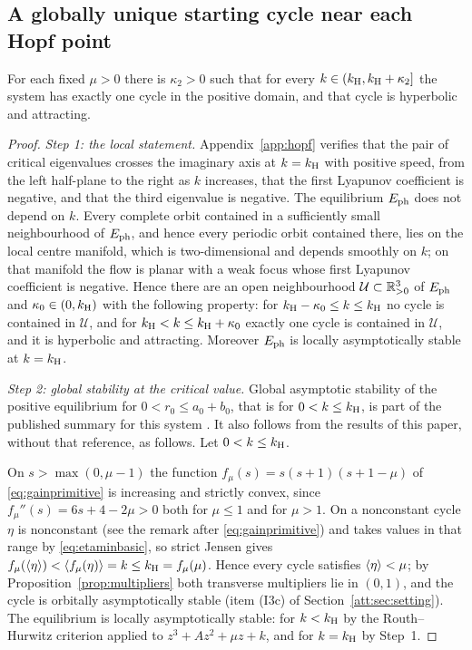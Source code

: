 \subsection{A globally unique starting cycle near each Hopf point}
\begin{lemma}\label{lem:collar}
For each fixed $\mu>0$ there is $\kappa_2>0$ such that for every $k\in(k_{\mathrm H},k_{\mathrm H}+\kappa_2]$ the system has exactly one cycle in the positive domain, and that cycle is hyperbolic and attracting.
\end{lemma}
\begin{proof}
\emph{Step 1: the local statement.} Appendix~\ref{app:hopf} verifies that the pair of critical eigenvalues crosses the imaginary axis at $k=k_{\mathrm H}$ with positive speed, from the left half-plane to the right as $k$ increases, that the first Lyapunov coefficient is negative, and that the third eigenvalue is negative. The equilibrium $E_{\rm ph}$ does not depend on $k$. Every complete orbit contained in a sufficiently small neighbourhood of $E_{\rm ph}$, and hence every periodic orbit contained there, lies on the local centre manifold, which is two-dimensional and depends smoothly on $k$; on that manifold the flow is planar with a weak focus whose first Lyapunov coefficient is negative. Hence there are an open neighbourhood $\mathcal U\subset\mathbb R^3_{>0}$ of $E_{\rm ph}$ and $\kappa_0\in(0,k_{\mathrm H})$ with the following property: for $k_{\mathrm H}-\kappa_0\le k\le k_{\mathrm H}$ no cycle is contained in $\mathcal U$, and for $k_{\mathrm H}<k\le k_{\mathrm H}+\kappa_0$ exactly one cycle is contained in $\mathcal U$, and it is hyperbolic and attracting. Moreover $E_{\rm ph}$ is locally asymptotically stable at $k=k_{\mathrm H}$.

\emph{Step 2: global stability at the critical value.} Global asymptotic stability of the positive equilibrium for $0<r_0\le a_0+b_0$, that is for $0<k\le k_{\mathrm H}$, is part of the published summary for this system \cite[Theorem 13]{BH23}. It also follows from the results of this paper, without that reference, as follows. Let $0<k\le k_{\mathrm H}$.

On $s>\max(0,\mu-1)$ the function $f_\mu(s)=s(s+1)(s+1-\mu)$ of \eqref{eq:gainprimitive} is increasing and strictly convex, since $f_\mu''(s)=6s+4-2\mu>0$ both for $\mu\le1$ and for $\mu>1$. On a nonconstant cycle $\eta$ is nonconstant (see the remark after \eqref{eq:gainprimitive}) and takes values in that range by \eqref{eq:etaminbasic}, so strict Jensen gives $f_\mu(\left\langle \eta\right\rangle)<\left\langle f_\mu(\eta)\right\rangle=k\le k_{\mathrm H}=f_\mu(\mu)$. Hence every cycle satisfies $\left\langle \eta\right\rangle<\mu$; by Proposition~\ref{prop:multipliers} both transverse multipliers lie in $(0,1)$, and the cycle is orbitally asymptotically stable (item (I3c) of Section~\ref{att:sec:setting}). The equilibrium is locally asymptotically stable: for $k<k_{\mathrm H}$ by the Routh--Hurwitz criterion applied to $z^3+Az^2+\mu z+k$, and for $k=k_{\mathrm H}$ by Step~1.


\end{proof}
